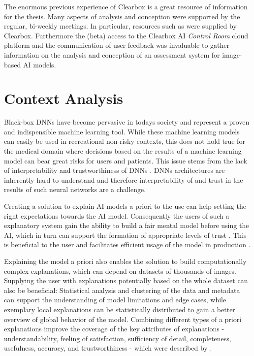 \documentclass[11pt,a4paper,english]{scrreprt}
\begin{document}
The enormous previous experience of Clearbox is a great resource of information for the thesis. Many aspects of analysis and conception were supported by the regular, bi-weekly meetings. In particular, resources such as \textcite{people_ai_google_website, captum_website,streamlit_website, lapuschkin_unmasking_2019} were supplied by Clearbox. Furthermore the (beta) access to the Clearbox AI \textit{Control Room} cloud platform and the communication of user feedback was invaluable to gather information on the analysis and conception of an assessment system for image-based AI models.

\section{Context Analysis}
Black-box DNNs have become pervasive in todays society and represent a proven and indispensible machine learning tool. While these machine learning models can easily be used in recreational non-risky contexts, this does not hold true for the medical domain where decisions based on the results of a machine learning model can bear great risks for users and patients. This issue stems from the lack of interpretability and trustworthiness of DNNs \parencite{adadi_blackbox_2018}. DNNs architectures are inherently hard to understand and therefore interpretability of and trust in the results of such neural networks are a challenge.

Creating a solution to explain AI models a priori to the use can help setting the right expectations towards the AI model. Consequently the users of such a explanatory system gain the ability to build a fair mental model before using the AI, which in turn can support the formation of appropriate levels of trust \parencite{hoffman_metrics_2019}. This is beneficial to the user and facilitates efficient usage of the model in production \parencite{hoffman_metrics_2019, people_ai_google_website}.

Explaining the model a priori also enables the solution to build computationally complex explanations, which can depend on datasets of thousands of images. Supplying the user with explanations potentially based on the whole dataset can also be beneficial: Statistical analysis and clustering of the data and metadata can support the understanding of model limitations and edge cases, while exemplary local explanations can be statistically distributed to gain a better overview of global behavior of the model. Combining different types of a priori explanations improve the coverage of the key attributes of explanations - understandability, feeling of satisfaction, sufficiency of detail, completeness, usefulness, accuracy, and trustworthiness - which were described by \textcite{hoffman_metrics_2019}.
\end{document}
